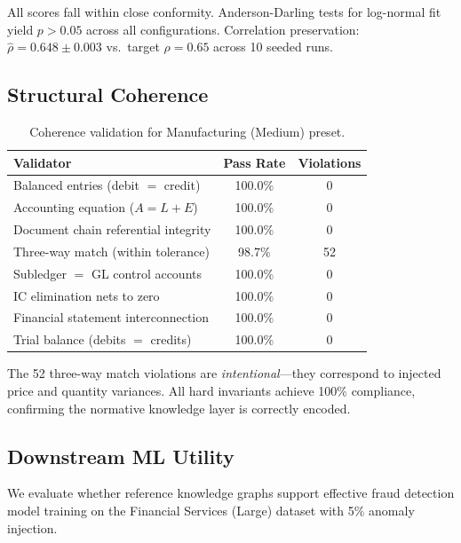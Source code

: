 All scores fall within close conformity.  Anderson-Darling tests for
log-normal fit yield $p > 0.05$ across all configurations.  Correlation
preservation: $\hat{\rho} = 0.648 \pm 0.003$ vs.\ target $\rho = 0.65$
across 10 seeded runs.

\subsection{Structural Coherence}
\label{sec:exp_coherence}

\begin{table}[t]
\centering
\caption{Coherence validation for Manufacturing (Medium) preset.}
\label{tab:coherence_results}
\small
\begin{tabular}{lcc}
\toprule
\textbf{Validator} & \textbf{Pass Rate} & \textbf{Violations} \\
\midrule
Balanced entries (debit $=$ credit)   & 100.0\% & 0 \\
Accounting equation ($A = L + E$)     & 100.0\% & 0 \\
Document chain referential integrity  & 100.0\% & 0 \\
Three-way match (within tolerance)    & 98.7\%  & 52 \\
Subledger $=$ GL control accounts     & 100.0\% & 0 \\
IC elimination nets to zero           & 100.0\% & 0 \\
Financial statement interconnection   & 100.0\% & 0 \\
Trial balance (debits $=$ credits)    & 100.0\% & 0 \\
\bottomrule
\end{tabular}
\end{table}

The 52 three-way match violations are \emph{intentional}---they
correspond to injected price and quantity variances.  All hard
invariants achieve 100\% compliance, confirming the normative
knowledge layer is correctly encoded.

\subsection{Downstream ML Utility}
\label{sec:exp_ml}

We evaluate whether reference knowledge graphs support effective fraud
detection model training on the Financial Services (Large) dataset
with 5\% anomaly injection.

